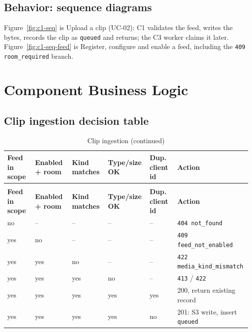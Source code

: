 
\subsection{Behavior: sequence diagrams}
Figure~\ref{fig:c1-seq} is Upload a clip (UC-02): C1 validates the feed, writes the bytes, records the clip as
\texttt{queued} and returns; the C3 worker claims it later. Figure~\ref{fig:c1-seq-feed} is Register, configure and
enable a feed, including the \texttt{409 room\_required} branch.


\section{Component Business Logic}

\subsection{Clip ingestion decision table}
\begin{longtable}{L{1.7cm}L{2.2cm}L{1.9cm}L{2.4cm}L{2.0cm}L{4.2cm}}
\caption{Clip ingestion}\label{tab:c1-dt-ingest}\\
\toprule
\textbf{Feed in scope} & \textbf{Enabled + room} & \textbf{Kind matches} & \textbf{Type/size OK} & \textbf{Dup. client id} & \textbf{Action} \\
\midrule
\endfirsthead
\caption[]{Clip ingestion (continued)}\\
\toprule
\textbf{Feed in scope} & \textbf{Enabled + room} & \textbf{Kind matches} & \textbf{Type/size OK} & \textbf{Dup. client id} & \textbf{Action} \\
\midrule
\endhead
no & -- & -- & -- & -- & \texttt{404 not\_found} \\
yes & no & -- & -- & -- & \texttt{409 feed\_not\_enabled} \\
yes & yes & no & -- & -- & \texttt{422 media\_kind\_mismatch} \\
yes & yes & yes & no & -- & \texttt{413} / \texttt{422} \\
yes & yes & yes & yes & yes & 200, return existing record \\
yes & yes & yes & yes & no & 201: S3 write, insert \texttt{queued} \\
\bottomrule
\end{longtable}

